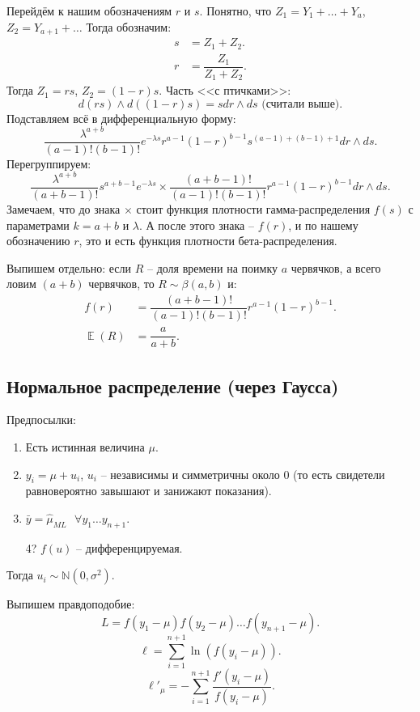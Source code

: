 \documentclass[10pt, a4paper]{extarticle}
\DeclareMathOperator{\E}{\mathbb{E}}
\begin{document}
Перейдём к нашим обозначениям $r$ и $s$. Понятно, что $Z_1 = Y_1 + \dots + Y_a$, $Z_2 = Y_{a+1} + \dots$ Тогда обозначим:
\begin{align*}
	s &= Z_1 + Z_2. \\
	r &= \dfrac{Z_1}{Z_1 + Z_2}.
\end{align*}
Тогда $Z_1 = rs$, $Z_2 = (1-r)s$. Часть <<с птичками>>:
\[
d(rs) \land d((1-r)s) = sdr \land ds \text{ (считали выше).}
\]
Подставляем всё в дифференциальную форму:
\[
\dfrac{\lambda^{a+b}}{(a-1)!(b-1)!}e^{-\lambda s} r^{a-1} (1-r)^{b-1} s^{(a-1)+(b-1)+1}dr\land ds.
\]
Перегруппируем:
\[
\dfrac{\lambda^{a+b}}{(a+b-1)!}s^{a+b-1}e^{-\lambda s} \times \dfrac{(a+b-1)!}{(a-1)!(b-1)!}r^{a-1}(1-r)^{b-1}dr\land ds.
\]
Замечаем, что до знака $\times$ стоит функция плотности гамма-распределения $f(s)$ с параметрами $k=a+b$ и $\lambda$. А после этого знака -- $f(r)$, и по нашему обозначению $r$, это и есть функция плотности бета-распределения. 

Выпишем отдельно: если $R$ -- доля времени на поимку $a$ червячков, а всего ловим $(a+b)$ червячков, то $R \sim \beta(a, b)$ и:
\begin{align*}
f(r) &= \dfrac{(a+b-1)!}{(a-1)!(b-1)!}r^{a-1}(1-r)^{b-1}. \\
\E(R) &= \dfrac{a}{a+b}.
\end{align*}

\subsection{Нормальное распределение (через Гаусса)}

Предпосылки:
\begin{enumerate}
	\item Есть истинная величина $\mu$.
	\item $y_i = \mu + u_i$, $u_i$ -- независимы и симметричны около 0 (то есть свидетели равновероятно завышают и занижают показания).
	\item $\bar{y} = \hat{\mu}_{ML} \text{ } \forall y_1 \dots y_{n+1}$.
	\item[4?] $f(u)$ -- дифференцируемая.
\end{enumerate}
Тогда $u_i \sim \mathbb{N}(0, \sigma^2)$.

Выпишем правдоподобие:
\[
L = f(y_1 - \mu)f(y_2 - \mu)\dots f(y_{n+1}-\mu).
\]
\[
\ell = \sum_{i=1}^{n+1}\ln(f(y_i-\mu)).
\]
\[
\ell'_{\mu} = -\sum_{i=1}^{n+1} \dfrac{f'(y_i-\mu)}{f(y_i-\mu)}.
\]
\end{document}
